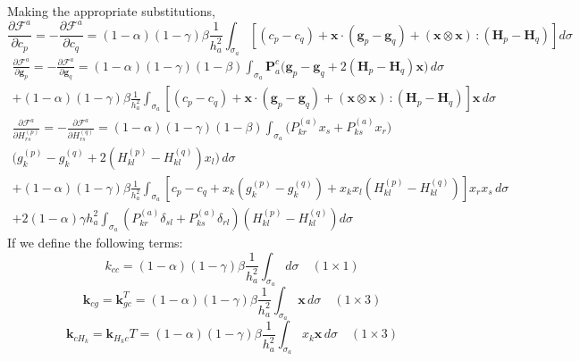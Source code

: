 \documentclass[11pt]{article} %
\begin{document}
Making the appropriate substitutions,
\begin{equation}
	\frac{\partial \mathcal{F}^a}{\partial c_p} = - \frac{\partial \mathcal{F}^a}{\partial c_q} = (1-\alpha) (1-\gamma) \beta \frac{1}{h_a^2} \int_{\sigma_a} \left[ (c_p - c_q) + \mathbf{x} \cdot (\mathbf{g}_p - \mathbf{g}_q) + (\mathbf{x} \otimes \mathbf{x}) \, \colon (\mathbf{H}_{p} - \mathbf{H}_{q}) \right] d \sigma
\end{equation}
\begin{eqnarray}
	\frac{\partial \mathcal{F}^a}{\partial \mathbf{g}_p} = - \frac{\partial \mathcal{F}^a}{\partial \mathbf{g}_q} = (1-\alpha)(1-\gamma)(1-\beta) \int_{\sigma_a} \mathbf{P}^c_a \bigg( \mathbf{g}_p - \mathbf{g}_q + 2 (\mathbf{H}_p - \mathbf{H}_q) \mathbf{x} \bigg) \, d \sigma \nonumber \\ + (1-\alpha) (1-\gamma) \beta \frac{1}{h_a^2} \int_{\sigma_a} \left[ (c_p - c_q) + \mathbf{x} \cdot (\mathbf{g}_p - \mathbf{g}_q) + (\mathbf{x} \otimes \mathbf{x}) \, \colon (\mathbf{H}_{p} - \mathbf{H}_{q}) \right] \mathbf{x} \, d \sigma
\end{eqnarray}
\begin{eqnarray}
	\frac{\partial \mathcal{F}^a}{\partial H^{(p)}_{rs}} = - \frac{\partial \mathcal{F}^a}{\partial H^{(q)}_{rs}} = (1-\alpha)(1-\gamma)(1-\beta) \int_{\sigma_a} \bigg( P^{(a)}_{kr} x_s + P^{(a)}_{ks} x_r \bigg) \nonumber \\ \bigg( g^{(p)}_k - g^{(q)}_k + 2 (H^{(p)}_{kl} - H^{(q)}_{kl}) x_l \bigg) \, d \sigma \nonumber \\ + (1-\alpha) (1-\gamma) \beta \frac{1}{h_a^2} \int_{\sigma_a} \left[ c_p - c_q + x_k (g^{(p)}_k - g^{(q)}_k) + x_k x_l (H^{(p)}_{kl} - H^{(q)}_{kl}) \right] x_r x_s \, d \sigma \nonumber \\ + 2 (1-\alpha) \gamma h_a^2 \int_{\sigma_a} (P^{(a)}_{kr} \delta_{sl} + P^{(a)}_{ks} \delta_{rl}) ( H^{(p)}_{kl} - H^{(q)}_{kl} ) d \sigma
\end{eqnarray}
If we define the following terms:
\begin{equation}
	k_{cc} = (1-\alpha) (1-\gamma) \beta \frac{1}{h_a^2} \int_{\sigma_a} d \sigma \quad (1 \times 1)
\end{equation}
\begin{equation}
	\mathbf{k}_{cg} = \mathbf{k}_{gc}^T = (1-\alpha) (1-\gamma) \beta \frac{1}{h_a^2} \int_{\sigma_a} \mathbf{x} \, d \sigma \quad (1 \times 3)
\end{equation}
\begin{equation}
	\mathbf{k}_{cH_k} = \mathbf{k}_{H_kc}T = (1-\alpha) (1-\gamma) \beta \frac{1}{h_a^2} \int_{\sigma_a} x_k \mathbf{x} \, d \sigma \quad (1 \times 3)
\end{equation}
\end{document}
